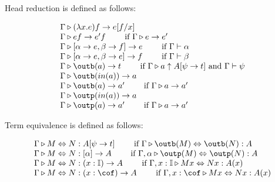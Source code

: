 \documentclass{article}
\begin{document}
\begin{definition}
  Head reduction is defined as follows:

  \[
    \begin{array}{lr}
      \Gamma \triangleright (\lambda x. e)f \rightarrow e[f/x] \\
      \Gamma \triangleright ef \to e'f \qquad \text{ if } \Gamma \triangleright e \to e' \\
      \Gamma \triangleright [\alpha \to e, \beta \to f] \rightarrow e \qquad \text{ if } \Gamma \vdash \alpha\\
      \Gamma \triangleright [\alpha \to e, \beta \to e] \rightarrow f \qquad \text{ if } \Gamma \vdash \beta\\
      \Gamma \triangleright \outb(a) \rightarrow t \qquad \text{ if } \Gamma \triangleright a \uparrow A[\psi \to t] \text{ and } \Gamma \vdash \psi \\
      \Gamma \triangleright \outb(in(a)) \rightarrow a \\
      \Gamma \triangleright \outb(a) \rightarrow a' \qquad \text{ if } \Gamma \triangleright a \rightarrow a' \\
      \Gamma \triangleright \outp(in(a)) \rightarrow a \\
      \Gamma \triangleright \outp(a) \rightarrow a' \qquad \text{ if  } \Gamma \triangleright a \rightarrow a'\\
    \end{array}
  \]
\end{definition}


\begin{definition}
  Term equivalence is defined as follows:

  \[
    \begin{array}{lr}
      \Gamma \triangleright M \Leftrightarrow N : A[\psi \to t] \qquad \text{ if } \Gamma \triangleright \outb(M) \Leftrightarrow \outb(N) : A\\
      \Gamma \triangleright M \Leftrightarrow N : [\alpha] \to A \qquad \text{ if } \Gamma, \alpha \triangleright \outp(M) \Leftrightarrow \outp(N) : A\\
      \Gamma \triangleright M \Leftrightarrow N : (x : \mathbb{I}) \to A \qquad \text{ if } \Gamma, x : \mathbb{I} \triangleright M x \Leftrightarrow N x : A(x)\\
      \Gamma \triangleright M \Leftrightarrow N : (x : \cof) \to A \qquad \text{ if } \Gamma, x : \cof \triangleright M x \Leftrightarrow N x : A(x)\\
    \end{array}
  \]
\end{definition}
\end{document}
